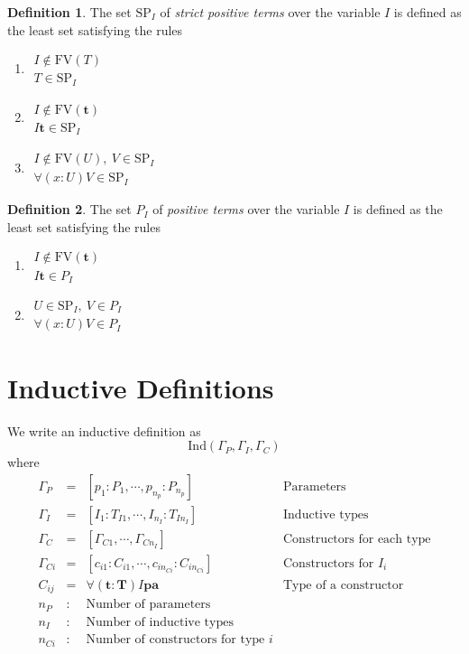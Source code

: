 \documentclass[12pt]{article}
\def\ind{\text{Ind}}
\def\abold{\mathbf{a}}
\def\pbold{\mathbf{p}}
\def\tbold{\mathbf{t}}
\def\Tbold{\mathbf{T}}
\def\freevars{\text{FV}}
\def\strictpos{\text{SP}}
\newcommand{\ruleh}[2]{\begin{array}{c} #1 \\ \hline #2\end{array}}
\theoremstyle{definition} \newtheorem{definition}{Definition}[section]
\theoremstyle{definition} \newtheorem{theorem}[definition]{Theorem}
\theoremstyle{definition} \newtheorem{lemma}[definition]{Lemma}
\begin{document}
\begin{definition}
  The set $\strictpos_I$ of \emph{strict positive terms} over the variable $I$
  is defined as the least set satisfying the rules
  \begin{enumerate}

  \item
    $\ruleh{I \notin \freevars(T)}{T \in \strictpos_I}$

  \item
    $\ruleh{I \notin \freevars(\tbold)} {I \tbold \in \strictpos_I}$

  \item
    $\ruleh{I \notin \freevars(U),\: V \in \strictpos_I} {\forall(x:U) V \in
      \strictpos_I}$
  \end{enumerate}
\end{definition}

\begin{definition}
  The set $P_I$ of \emph{positive terms} over the variable $I$ is
  defined as the least set satisfying the rules
  \begin{enumerate}
  \item
    $\ruleh{I \notin \freevars(\tbold)} {I \tbold \in P_I}$

  \item
    $\ruleh{U \in \strictpos_I,\: V \in P_I}  {\forall(x:U) V \in P_I}$
  \end{enumerate}
\end{definition}






 \section{Inductive Definitions}
\label{sec:inductivedefintions}

We write an inductive definition as
$$\ind(\Gamma_P, \Gamma_I, \Gamma_C)$$
where
$$
\begin{array}{llll}
  \Gamma_P &=& [p_1:P_1, \cdots , p_{n_p}:P_{n_p}]
  &\text{Parameters}
  \\
  \Gamma_I &=& [I_1:T_{I1}, \cdots, I_{n_I}: T_{In_I}]
  &\text{Inductive types}
  \\
  \Gamma_C &=& [\Gamma_{C1}, \cdots, \Gamma_{Cn_I}]
  &\text{Constructors for each type}
  \\
  \Gamma_{Ci} &=& [c_{i1}:C_{i1}, \cdots, c_{in_{Ci}}: C_{in_{Ci}}]
  &\text{Constructors for }I_i
  \\
  C_{ij} &=& \forall(\tbold:\Tbold) I \pbold \abold
  & \text{Type of a constructor}
  \\
  n_P &:& \text{Number of parameters} \\
  n_I &:& \text{Number of inductive types} \\
  n_{Ci} &:& \text{Number of constructors for type } i
\end{array}
$$
\end{document}
